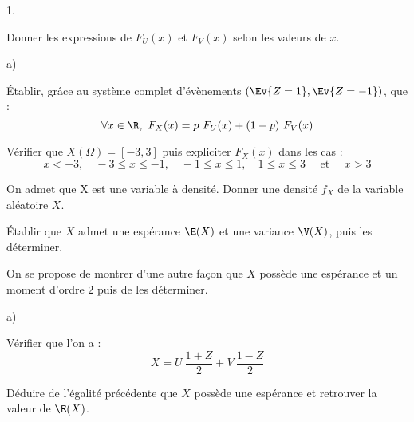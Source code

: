 \begin{noliste}{1.}
  \setlength{\itemsep}{4mm}
\item Donner les expressions de $F_U(x)$ et $F_V(x)$ selon les valeurs
  de $x$.

  

\item
  \begin{noliste}{a)}
    \setlength{\itemsep}{2mm}
  \item Établir, grâce au système complet d'évènements $\left( \Ev{Z =
        1}, \Ev{Z = -1} \right)$, que :
    \[
    \forall x\in\R, \ F_X(x) = p \ F_U(x) + (1-p) \ F_V(x)
    \]

    
    
  \item Vérifier que $X(\Omega) = [-3,3]$ puis expliciter $F_X(x)$
    dans les cas :
    \[
    x<-3, \quad -3\leq x\leq-1, \quad -1\leq x\leq1, \quad 1 \leq x
    \leq 3 \quad \text{ et } \quad x>3
    \]

    



    
  \item On admet que X est une variable à densité. Donner une densité
    $f_{X}$ de la variable aléatoire $X$.

    	    

  \item Établir que $X$ admet une espérance $\E(X)$ et une variance
    $\V(X)$, puis les déterminer.

        
  \end{noliste}

  
  \newpage

  
\item On se propose de montrer d'une autre façon que $X$ possède une
  espérance et un moment d'ordre $2$ puis de les déterminer.

  \begin{noliste}{a)}
    \setlength{\itemsep}{2mm}
  \item Vérifier que l'on a :
    \[
    X = U \ \dfrac{1 + Z}{2} + V \ \dfrac{1-Z}{2}
    \]    

    




  \item Déduire de l'égalité précédente que $X$ possède une espérance
    et retrouver la valeur de $\E(X)$.

    	    





\end{noliste}
\end{noliste}
